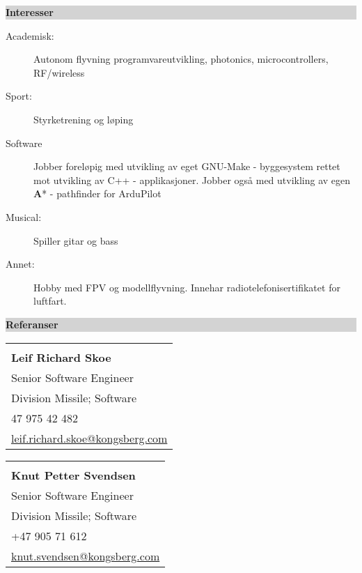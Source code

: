 \documentclass[letterpaper,11pt]{article}
\newcommand{\mycolorbox}[2]{{\noindent\colorbox{#1}{\begin{minipage}{\linewidth-2\fboxsep}{\textbf{#2}}\end{minipage}}}}
\newcommand{\resheading}[1]{{\large \mycolorbox{lightgray}{#1}}}%
\newcommand{\resreference}[5]{
\begin{tabular}{l}
                \vspace{-5pt} \\
		\textbf{#1} \\
                #2 \\
		#3 \\
                #4 \\
                \url{#5} \\
                \hline
\end{tabular}}
\begin{document}
\resheading{Interesser}

\begin{description}
\item[Academisk:] Autonom flyvning  programvareutvikling, photonics, microcontrollers, RF/wireless
\item[Sport:] Styrketrening og løping
\item[Software] Jobber foreløpig med utvikling av eget GNU-Make - byggesystem rettet mot utvikling av C++ - applikasjoner. Jobber også med utvikling av egen \textbf{A}* - pathfinder for ArduPilot
\item[Musical:] Spiller gitar og bass
\item[Annet:] Hobby med FPV og modellflyvning. Innehar radiotelefonisertifikatet for luftfart.
\end{description}

\resheading{Referanser}
\resreference{Leif Richard Skoe}{Senior Software Engineer}{Division Missile; Software}{47 975 42 482}{leif.richard.skoe@kongsberg.com}
\resreference{Knut Petter Svendsen}{Senior Software Engineer}{Division Missile; Software}{+47 905 71 612}{knut.svendsen@kongsberg.com}
\end{document}
